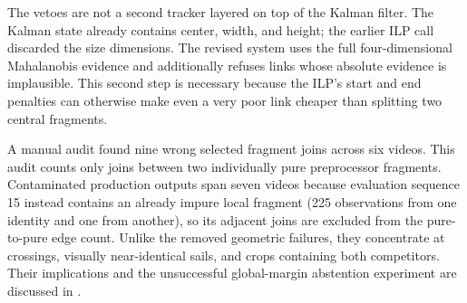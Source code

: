 The vetoes are not a second tracker layered on top of the Kalman filter.  The Kalman
state already contains center, width, and height; the earlier ILP call discarded the
size dimensions.  The revised system uses the full four-dimensional Mahalanobis
evidence and additionally refuses links whose absolute evidence is implausible.  This
second step is necessary because the ILP's start and end penalties can otherwise make
even a very poor link cheaper than splitting two central fragments.

A manual audit found nine wrong selected fragment joins across six videos.  This audit
counts only joins between two individually pure preprocessor fragments.  Contaminated
production outputs span seven videos because evaluation sequence 15 instead contains an
already impure local fragment (225 observations from one identity and one from
another), so its adjacent joins are excluded from the pure-to-pure edge count.  Unlike the removed
geometric failures, they concentrate at crossings, visually near-identical sails,
and crops containing both competitors.  Their implications and the unsuccessful
global-margin abstention experiment are discussed in .
